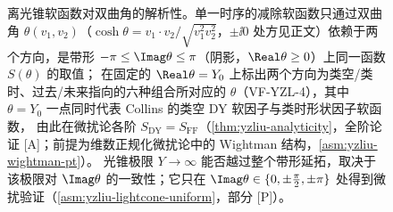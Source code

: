 \begin{figure}[htbp]
\caption{离光锥软函数对双曲角的解析性。单一时序的减除软函数只通过双曲角 $\theta(v_1,v_2)$（$\cosh\theta=v_1\cdot v_2/\sqrt{v_1^2v_2^2}$，$\pm\ii0$ 处方见正文）依赖于两个方向，是带形 $-\pi\le\Imag\theta\le\pi$（阴影，$\Real\theta\ge0$）上同一函数 $S(\theta)$ 的取值；
在固定的 $\Real\theta=Y_0$ 上标出两个方向为类空/类时、过去/未来指向的六种组合所对应的 $\theta$（VF-YZL-4），其中 $\theta=Y_0$ 一点同时代表 Collins 的类空 DY 软因子与类时形状因子软函数，
由此在微扰论各阶 $S_{\mathrm{DY}}=S_{\mathrm{FF}}$（\cref{thm:yzliu-analyticity}，全阶论证 [A]；前提为维数正规化微扰论中的 Wightman 结构，\cref{asm:yzliu-wightman-pt}）。
光锥极限 $Y\to\infty$ 能否越过整个带形延拓，取决于该极限对 $\Imag\theta$ 的一致性；它只在 $\Imag\theta\in\{0,\pm\frac{\pi}{2},\pm\pi\}$ 处得到微扰验证（\cref{asm:yzliu-lightcone-uniform}，部分 [P]）。}
\label{fig:yzliu-theta-strip}
\end{figure}

